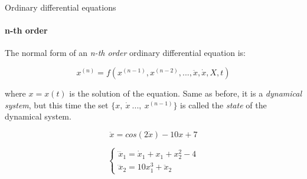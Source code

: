 \documentclass{beamer}
\begin{document}
\begin{frame}{Ordinary differential equations}
\framesubtitle{n-th order}
\begin{flushleft}

The normal form of an \emph{n-th order} ordinary differential equation is:

\begin{equation}
    x^{(n)} = f (x^{(n-1)}, x^{(n-2)}, ..., \ddot{x}, \dot{x}, X, t)
\end{equation}

where $x = x(t)$ is the solution of the equation. Same as before, it is a \emph{dynamical system}, but this time the set $\{ x, \ \dot{x} \ ..., \ x^{(n-1)} \}$ is called the \emph{state} of the dynamical system.

\begin{example}
\begin{equation}
    \ddot{x} = cos(2\dot{x}) - 10 x + 7 
\end{equation}
\end{example}


\begin{example}
\begin{equation}
\begin{cases}
    \dddot{x}_1 = \dot{x}_1 + x_1 + x_2^2 - 4 \\
    \dddot{x}_2 = 10 x_1^3 + \ddot{x}_2
\end{cases}
\end{equation}
\end{example}

\end{flushleft}
\end{frame}
\end{document}
